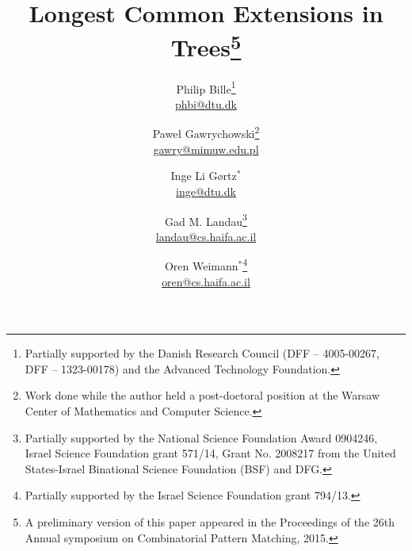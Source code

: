 \documentclass [10pt]{article}
\begin{document}
\title{Longest Common Extensions in Trees\footnote{A preliminary version of this paper appeared in the Proceedings of the 26th Annual symposium on Combinatorial Pattern Matching, 2015.}}
\author{Philip Bille\thanks{Partially supported by the Danish Research Council (DFF – 4005-00267, DFF – 1323-00178) and the Advanced Technology Foundation.} \\  \href{mailto:phbi@dtu.dk}{phbi@dtu.dk} \and Pawe{\l} Gawrychowski\thanks{Work done while the author held a post-doctoral position
at the Warsaw Center of Mathematics and Computer Science.}\\ \href{mailto:gawry@mimuw.edu.pl}{gawry@mimuw.edu.pl} \and Inge Li G{\o}rtz$^{\ast}$\\
 \href{mailto:inge@dtu.dk}{inge@dtu.dk}    \and  
 Gad M. Landau\thanks{Partially supported by the National Science Foundation
Award 0904246, Israel Science Foundation grant  571/14,
Grant No. 2008217 from the United States-Israel
Binational Science Foundation (BSF) and DFG.} \\  \href{mailto:landau@cs.haifa.ac.il}{landau@cs.haifa.ac.il}   
\and Oren Weimann$^{\ast}$\thanks{Partially supported by  the Israel Science Foundation grant 794/13.} \\  \href{mailto:oren@cs.haifa.ac.il}{oren@cs.haifa.ac.il} }
\date{}

\maketitle
\end{document}
